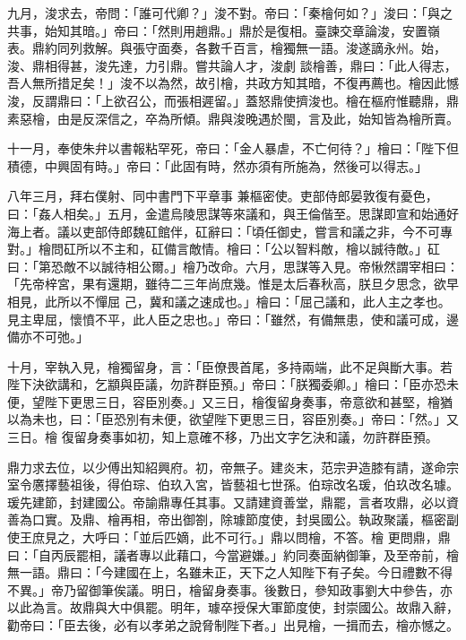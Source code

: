 \begin{pinyinscope}
 九月，浚求去，帝問：「誰可代卿？」浚不對。帝曰：「秦檜何如？」浚曰：「與之共事，始知其暗。」帝曰：「然則用趙鼎。」鼎於是復相。臺諫交章論浚，安置嶺表。鼎約同列救解。與張守面奏，各數千百言，檜獨無一語。浚遂謫永州。始，浚、鼎相得甚，浚先達，力引鼎。嘗共論人才，浚劇
 談檜善，鼎曰：「此人得志，吾人無所措足矣！」浚不以為然，故引檜，共政方知其暗，不復再薦也。檜因此憾浚，反謂鼎曰：「上欲召公，而張相遲留。」蓋怒鼎使擠浚也。檜在樞府惟聽鼎，鼎素惡檜，由是反深信之，卒為所傾。鼎與浚晚遇於閩，言及此，始知皆為檜所賣。



 十一月，奉使朱弁以書報粘罕死，帝曰：「金人暴虐，不亡何待？」檜曰：「陛下但積德，中興固有時。」帝曰：「此固有時，然亦須有所施為，然後可以得志。」



 八年三月，拜右僕射、同中書門下平章事
 兼樞密使。吏部侍郎晏敦復有憂色，曰：「姦人相矣。」五月，金遣烏陵思謀等來議和，與王倫偕至。思謀即宣和始通好海上者。議以吏部侍郎魏矼館伴，矼辭曰：「頃任御史，嘗言和議之非，今不可專對。」檜問矼所以不主和，矼備言敵情。檜曰：「公以智料敵，檜以誠待敵。」矼曰：「第恐敵不以誠待相公爾。」檜乃改命。六月，思謀等入見。帝愀然謂宰相曰：「先帝梓宮，果有還期，雖待二三年尚庶幾。惟是太后春秋高，朕旦夕思念，欲早相見，此所以不憚屈
 己，冀和議之速成也。」檜曰：「屈己議和，此人主之孝也。見主卑屈，懷憤不平，此人臣之忠也。」帝曰：「雖然，有備無患，使和議可成，邊備亦不可弛。」



 十月，宰執入見，檜獨留身，言：「臣僚畏首尾，多持兩端，此不足與斷大事。若陛下決欲講和，乞顓與臣議，勿許群臣預。」帝曰：「朕獨委卿。」檜曰：「臣亦恐未便，望陛下更思三日，容臣別奏。」又三日，檜復留身奏事，帝意欲和甚堅，檜猶以為未也，曰：「臣恐別有未便，欲望陛下更思三日，容臣別奏。」帝曰：「然。」又三日。檜
 復留身奏事如初，知上意確不移，乃出文字乞決和議，勿許群臣預。



 鼎力求去位，以少傅出知紹興府。初，帝無子。建炎末，范宗尹造膝有請，遂命宗室令懬擇藝祖後，得伯琮、伯玖入宮，皆藝祖七世孫。伯琮改名瑗，伯玖改名璩。瑗先建節，封建國公。帝諭鼎專任其事。又請建資善堂，鼎罷，言者攻鼎，必以資善為口實。及鼎、檜再相，帝出御劄，除璩節度使，封吳國公。執政聚議，樞密副使王庶見之，大呼曰：「並后匹嫡，此不可行。」鼎以問檜，不答。檜
 更問鼎，鼎曰：「自丙辰罷相，議者專以此藉口，今當避嫌。」約同奏面納御筆，及至帝前，檜無一語。鼎曰：「今建國在上，名雖未正，天下之人知陛下有子矣。今日禮數不得不異。」帝乃留御筆俟議。明日，檜留身奏事。後數日，參知政事劉大中參告，亦以此為言。故鼎與大中俱罷。明年，璩卒授保大軍節度使，封崇國公。故鼎入辭，勸帝曰：「臣去後，必有以孝弟之說脅制陛下者。」出見檜，一揖而去，檜亦憾之。




\end{pinyinscope}
